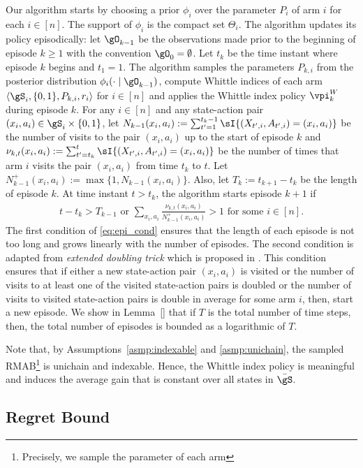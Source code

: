 Our algorithm starts by choosing a prior $\phi_i$ over the parameter $P_i$ of arm $i$ for each $i\in[n]$.
The support of $\phi_i$ is the compact set $\Theta_i$. The algorithm updates its policy episodically: let $\gO_{k-1}$ be the observations made prior to the beginning of episode $k\ge1$ with the convention $\gO_{0}=\emptyset$.
Let $t_k$ be the time instant where episode $k$ begins and $t_1=1$.
The algorithm samples the parameters $P_{k,i}$ from the posterior distribution $\phi_i(\cdot \mid \gO_{k-1})$, compute Whittle indices of each arm $\langle\gS_i,\{0,1\},P_{k,i},r_i\rangle$ for $i\in[n]$ and applies the Whittle index policy $\vpi_k^W$ during episode $k$.
For any $i\in[n]$ and any state-action pair $(x_i,a_i)\in\gS_i\times\{0,1\}$, let $N_{k-1}(x_i,a_i):=\sum_{t'=1}^{t_k-1}\sI{(X_{t',i},A_{t',i})=(x_i,a_i)}$ be the number of visits to the pair $(x_i,a_i)$ up to the start of episode $k$ and $\nu_{k,t}(x_i,a_i):=\sum_{t'=t_k}^{t}\sI{(X_{t',i},A_{t',i})=(x_i,a_i)}$ be the number of times that arm $i$ visits the pair $(x_i,a_i)$ from time $t_k$ to $t$. Let $N_{k-1}^+(x_i,a_i):=\max\{1,N_{k-1}(x_i,a_i)\}$. Also, let $T_k:=t_{k+1}-t_{k}$ be the length of episode $k$. At time instant $t>t_k$, the algorithm starts episode $k+1$ if
\begin{align}
    t-t_k > T_{k-1} \text{ or } \sum_{x_i,a_i} \frac{\nu_{k,t}(x_i,a_i)}{N_{k-1}^+(x_i,a_i)}>1 \text{ for some } i\in[n]. \label{eq:epi_cond}
\end{align}
The first condition of \eqref{eq:epi_cond} ensures that the length of each episode is not too long and grows linearly with the number of episodes.
The second condition is adapted from \emph{extended doubling trick} which is proposed in \cite{tossou2019near}.
This condition ensures that if either a new state-action pair $(x_i,a_i)$ is visited or the number of visits to at least one of the visited state-action pairs is doubled or the number of visits to visited state-action pairs is double in average for some arm $i$, then, start a new episode.
We show in Lemma~\ref{} that if $T$ is the total number of time steps, then, the total number of episodes is bounded as a logarithmic of $T$.

Note that, by Assumptions~\ref{asmp:indexable} and \ref{asmp:unichain}, the sampled RMAB\footnote{Precisely, we sample the parameter of each arm} is unichain and indexable.
Hence, the Whittle index policy is meaningful and induces the average gain that is constant over all states in $\bar{\gS}$.

\subsection{Regret Bound}
\label{ssec:regret_bound}

